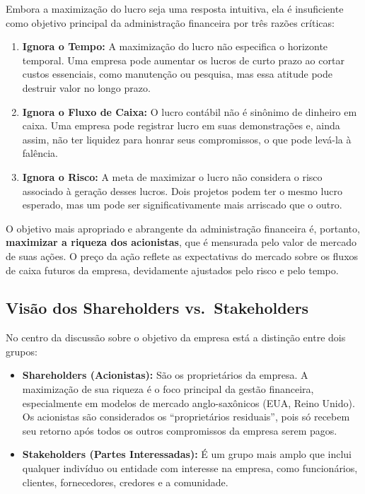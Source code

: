 \documentclass[
  a4paper,
]{book}
\providecommand{\tightlist}{%
  \setlength{\itemsep}{0pt}\setlength{\parskip}{0pt}}\usepackage{longtable,booktabs,array}
\begin{document}
Embora a maximização do lucro seja uma resposta intuitiva, ela é
insuficiente como objetivo principal da administração financeira por
três razões críticas:

\begin{enumerate}
\def\labelenumi{\arabic{enumi}.}
\tightlist
\item
  \textbf{Ignora o Tempo:} A maximização do lucro não especifica o
  horizonte temporal. Uma empresa pode aumentar os lucros de curto prazo
  ao cortar custos essenciais, como manutenção ou pesquisa, mas essa
  atitude pode destruir valor no longo prazo.
\item
  \textbf{Ignora o Fluxo de Caixa:} O lucro contábil não é sinônimo de
  dinheiro em caixa. Uma empresa pode registrar lucro em suas
  demonstrações e, ainda assim, não ter liquidez para honrar seus
  compromissos, o que pode levá-la à falência.
\item
  \textbf{Ignora o Risco:} A meta de maximizar o lucro não considera o
  risco associado à geração desses lucros. Dois projetos podem ter o
  mesmo lucro esperado, mas um pode ser significativamente mais
  arriscado que o outro.
\end{enumerate}

O objetivo mais apropriado e abrangente da administração financeira é,
portanto, \textbf{maximizar a riqueza dos acionistas}, que é mensurada
pelo valor de mercado de suas ações. O preço da ação reflete as
expectativas do mercado sobre os fluxos de caixa futuros da empresa,
devidamente ajustados pelo risco e pelo tempo.

\subsection{Visão dos Shareholders
vs.~Stakeholders}\label{visuxe3o-dos-shareholders-vs.-stakeholders}

No centro da discussão sobre o objetivo da empresa está a distinção
entre dois grupos:

\begin{itemize}
\tightlist
\item
  \textbf{Shareholders (Acionistas):} São os proprietários da empresa. A
  maximização de sua riqueza é o foco principal da gestão financeira,
  especialmente em modelos de mercado anglo-saxônicos (EUA, Reino
  Unido). Os acionistas são considerados os ``proprietários residuais'',
  pois só recebem seu retorno após todos os outros compromissos da
  empresa serem pagos.
\item
  \textbf{Stakeholders (Partes Interessadas):} É um grupo mais amplo que
  inclui qualquer indivíduo ou entidade com interesse na empresa, como
  funcionários, clientes, fornecedores, credores e a comunidade.
\end{itemize}
\end{document}
